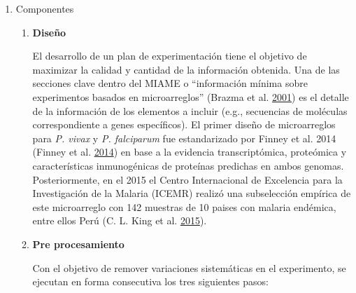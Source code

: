 \documentclass[a4paper]{article}
\begin{document}
\begin{enumerate}
\def\labelenumi{\alph{enumi}.}
\item
  Componentes

  \begin{enumerate}
  \def\labelenumii{\roman{enumii}.}
  \item
    \textbf{Diseño}

    El desarrollo de un plan de experimentación tiene el objetivo de
    maximizar la calidad y cantidad de la información obtenida. Una de
    las secciones clave dentro del MIAME o ``información mínima sobre
    experimentos basados en microarreglos'' (Brazma et al.
    \protect\hyperlink{ref-brazma2001}{2001}) es el detalle de la
    información de los elementos a incluir (e.g., secuencias de
    moléculas correspondiente a genes específicos). El primer diseño de
    microarreglos para \emph{P. vivax} y \emph{P. falciparum} fue
    estandarizado por Finney et al. 2014 (Finney et al.
    \protect\hyperlink{ref-Finney2014}{2014}) en base a la evidencia
    transcriptómica, proteómica y características inmunogénicas de
    proteínas predichas en ambos genomas. Posteriormente, en el 2015 el
    Centro Internacional de Excelencia para la Investigación de la
    Malaria (ICEMR) realizó una subselección empírica de este
    microarreglo con 142 muestras de 10 paises con malaria endémica,
    entre ellos Perú (C. L. King et al.
    \protect\hyperlink{ref-King2015FOC}{2015}).
  \item
    \textbf{Pre procesamiento}

    Con el objetivo de remover variaciones sistemáticas en el
    experimento, se ejecutan en forma consecutiva los tres siguientes
    pasos:


\end{enumerate}
\end{enumerate}
\end{document}
